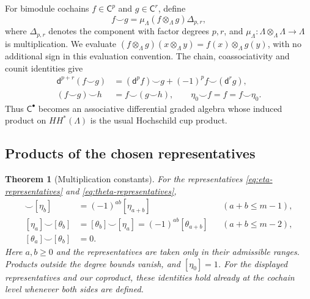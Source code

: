 \documentclass[a4paper,11pt,oneside,reqno]{amsart}
\newtheorem{theorem}{Theorem}[section]
\theoremstyle{definition}
\numberwithin{equation}{section}
\begin{document}
For bimodule cochains $f\in\mathsf C^p$ and
$g\in\mathsf C^r$, define
\begin{equation}\label{cup:eq:product-on-cochains}
 \boxed{f\smile g
 =\mu_\Lambda(f\otimes_\Lambda g)\Delta_{p,r},}
\end{equation}
where $\Delta_{p,r}$ denotes the component with factor degrees $p,r$,
and $\mu_\Lambda:\Lambda\otimes_\Lambda\Lambda\to\Lambda$
is multiplication. We evaluate
$(f\otimes_\Lambda g)(x\otimes_\Lambda y)=
f(x)\otimes_\Lambda g(y)$, with no additional sign in this
evaluation convention. The chain, coassociativity and counit
identities give
\begin{equation}\label{cup:eq:dga}
\begin{aligned}
 \mathsf d^{p+r}(f\smile g)
 &= (\mathsf d^p f)\smile g
 +(-1)^p f\smile(\mathsf d^r g),\\
 (f\smile g)\smile h&=f\smile(g\smile h),
 \qquad \eta_0\smile f=f=f\smile\eta_0.
\end{aligned}
\end{equation}
Thus $\mathsf C^\bullet$ becomes an associative differential graded
algebra whose induced product on $HH^*(\Lambda)$ is the usual
Hochschild cup product.

\subsection{Products of the chosen representatives}

\begin{theorem}[Multiplication constants]\label{cup:thm:products}
For the representatives \eqref{eq:eta-representatives} and
\eqref{eq:theta-representatives},
\begin{align}
 [\eta_a]\smile[\eta_b]
 &=(-1)^{ab}[\eta_{a+b}]
 &&(a+b\leq m-1),\label{cup:eq:etaeta}\\
 [\eta_a]\smile[\theta_b]
 &=[\theta_b]\smile[\eta_a]
 =(-1)^{ab}[\theta_{a+b}]
 &&(a+b\leq m-2),\label{cup:eq:etatheta}\\
 [\theta_a]\smile[\theta_b]&=0.
 \label{cup:eq:thetatheta}
\end{align}
Here $a,b\geq0$ and the representatives are taken only in their
admissible ranges. Products outside the degree bounds vanish,
and $[\eta_0]=1$. For the displayed representatives and our
coproduct, these identities hold already at the cochain level
whenever both sides are defined.
\end{theorem}
\end{document}
